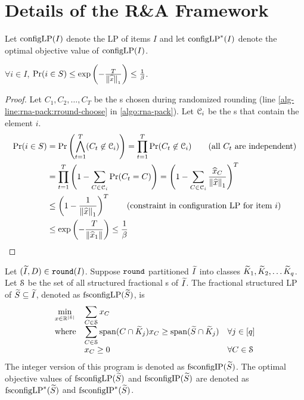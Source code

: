 \section{Details of the R\&A Framework}
\label{sec:rna-extra}

Let $\operatorname{configLP}(I)$ denote the \config{} LP of items $I$ and let $\operatorname{configLP}^*(I)$ denote the
optimal objective value of $\operatorname{configLP}(I)$.

\begin{lemma}
\label{thm:pr-elem-in-residual}
$\forall i \in I$, $\Pr(i \in S)
\le \exp\left(-\frac{T}{\left\lVert \widehat{x} \right\rVert_1}\right) \le \frac{1}{\beta}$.
\end{lemma}
\begin{proof}
Let $C_1, C_2, \ldots, C_T$ be the \config{}s chosen during randomized rounding
(line \ref{alg-line:rna-pack:rround-choose} in \cref{algo:rna-pack}).
Let $\mathcal{C}_i$ be the \config{}s that contain the element $i$.
\begin{align*}
\Pr(i \in S) &= \Pr\left(\bigwedge_{t=1}^T (C_t \not\in \Ccal_i) \right)
= \prod_{t=1}^T \Pr(C_t \not\in \Ccal_i)  \tag{all $C_t$ are independent}
\\ &= \prod_{t=1}^T \left(1 - \sum_{C \in \Ccal_i} \Pr(C_t = C)\right)
= \left(1 - \sum_{C \in \Ccal_i} \frac{\widehat{x}_C}{\norm{\widehat{x}}_1} \right)^T
\\ &\le \left(1 - \frac{1}{\norm{\widehat{x}}_1} \right)^T
\tag{constraint in \config{} LP for item $i$}
\\ &\le \exp\left( - \frac{T}{\norm{\widehat{x}_1}} \right)
\le \frac{1}{\beta}
\qedhere
\end{align*}
\end{proof}

\begin{definition}
Let $(\widetilde{I}, D) \in \operatorname{\mathtt{round}}(I)$. Suppose $\operatorname{\mathtt{round}}$ partitioned $\widetilde{I}$ into classes
$\widetilde{K}_1, \widetilde{K}_2, \ldots \widetilde{K}_q$.
Let $\mathcal{S}$ be the set of all structured fractional \config{}s of $\widetilde{I}$.
The fractional structured \config{} LP of $\widetilde{S} \subseteq \widetilde{I}$,
denoted as $\operatorname{fsconfigLP}(\widetilde{S})$, is
\[ \begin{array}{*3{>{\displaystyle}l}}
\min_{x \in \mathbb{R}^{|\Scal|}}
    & \multicolumn{2}{>{\displaystyle}l}{\sum_{C \in \Scal} x_C}
\\ \textrm{where} & \sum_{C \in \Scal} \Span(C \cap \Ktild_j)x_C
    \ge \Span(\Stild \cap \Ktild_j) & \forall j \in [q]
\\ & x_C \ge 0 & \forall C \in \Scal
\end{array} \]
The integer version of this program is denoted as $\operatorname{fsconfigIP}(\widetilde{S})$.
The optimal objective values of $\operatorname{fsconfigLP}(\widetilde{S})$ and $\operatorname{fsconfigIP}(\widetilde{S})$
are denoted as $\operatorname{fsconfigLP}^*(\widetilde{S})$ and $\operatorname{fsconfigIP}^*(\widetilde{S})$.
\end{definition}


